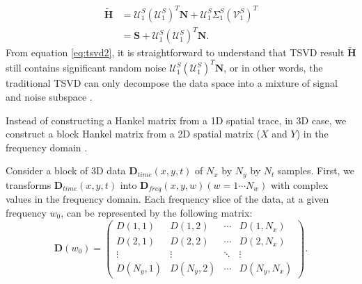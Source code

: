 {\begin{equation}
\label{eq:tsvd2}
\begin{split}
\tilde{\mathbf{H}} &= \mathcal{U}_1^S(\mathcal{U}_1^S)^T\mathbf{N} + \mathcal{U}_1^S\Sigma_1^S(\mathcal{V}_1^S)^T \\
 &=\mathbf{S} + \mathcal{U}_1^S(\mathcal{U}_1^S)^T\mathbf{N}.
\end{split}
\end{equation}
From equation \ref{eq:tsvd2}, it is straightforward to understand that TSVD result $\tilde{\mathbf{H}}$ still contains significant random noise $\mathcal{U}_1^S(\mathcal{U}_1^S)^T\mathbf{N}$, or in other words, the traditional TSVD can only decompose the data space into a mixture of signal and noise subspace \cite[]{weilin2017ieee}. 
}

Instead of constructing a Hankel matrix from a 1D spatial trace, in 3D case, we construct a block Hankel matrix from a 2D spatial matrix ($X$ and $Y$) in the frequency domain \cite[]{mssa}.  

Consider a block of 3D data $\mathbf{D}_{time}(x,y,t)$ of $N_x$ by $N_y$ by $N_t$ samples. First, we transforms $\mathbf{D}_{time}(x,y,t)$ into $\mathbf{D}_{freq}(x,y,w)(w=1\cdots N_w)$ with complex values in the frequency domain. Each frequency slice of the data, at a given frequency $w_0$, can be represented by the following matrix:
\begin{equation}
\label{eq:mssa3d}
\mathbf{D}(w_0)=\left(\begin{array}{cccc}
D(1,1) & D(1,2) & \cdots &D(1,N_x) \\
D(2,1) & D(2,2)  &\cdots &D(2,N_x) \\
\vdots & \vdots &\ddots &\vdots \\
D(N_y,1)&D(N_y,2) &\cdots&D(N_y,N_x)
\end{array}
\right).
\end{equation}

